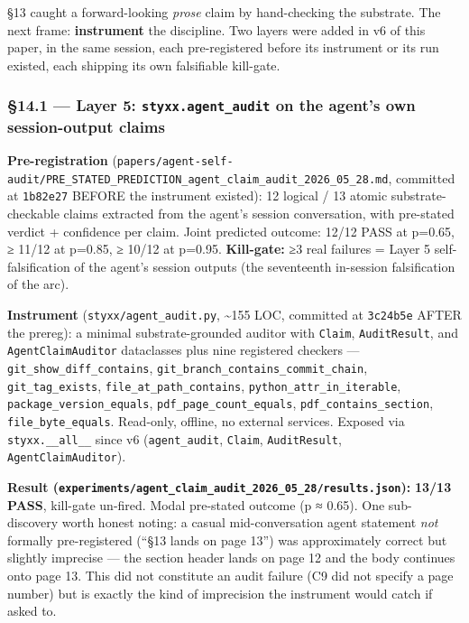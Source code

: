 \documentclass[
]{article}
\begin{document}
§13 caught a forward-looking \emph{prose} claim by hand-checking the
substrate. The next frame: \textbf{instrument} the discipline. Two
layers were added in v6 of this paper, in the same session, each
pre-registered before its instrument or its run existed, each shipping
its own falsifiable kill-gate.

\subsubsection{\texorpdfstring{§14.1 --- Layer 5:
\texttt{styxx.agent\_audit} on the agent's own session-output
claims}{§14.1 --- Layer 5: styxx.agent\_audit on the agent's own session-output claims}}\label{layer-5-styxx.agent_audit-on-the-agents-own-session-output-claims}

\textbf{Pre-registration}
(\texttt{papers/agent-self-audit/PRE\_STATED\_PREDICTION\_agent\_claim\_audit\_2026\_05\_28.md},
committed at \texttt{1b82e27} BEFORE the instrument existed): 12 logical
/ 13 atomic substrate-checkable claims extracted from the agent's
session conversation, with pre-stated verdict + confidence per claim.
Joint predicted outcome: 12/12 PASS at p=0.65, ≥ 11/12 at p=0.85, ≥
10/12 at p=0.95. \textbf{Kill-gate:} ≥3 real failures = Layer 5
self-falsification of the agent's session outputs (the seventeenth
in-session falsification of the arc).

\textbf{Instrument} (\texttt{styxx/agent\_audit.py}, \textasciitilde155
LOC, committed at \texttt{3c24b5e} AFTER the prereg): a minimal
substrate-grounded auditor with \texttt{Claim}, \texttt{AuditResult},
and \texttt{AgentClaimAuditor} dataclasses plus nine registered checkers
--- \texttt{git\_show\_diff\_contains},
\texttt{git\_branch\_contains\_commit\_chain},
\texttt{git\_tag\_exists}, \texttt{file\_at\_path\_contains},
\texttt{python\_attr\_in\_iterable}, \texttt{package\_version\_equals},
\texttt{pdf\_page\_count\_equals}, \texttt{pdf\_contains\_section},
\texttt{file\_byte\_equals}. Read-only, offline, no external services.
Exposed via \texttt{styxx.\_\_all\_\_} since v6 (\texttt{agent\_audit},
\texttt{Claim}, \texttt{AuditResult}, \texttt{AgentClaimAuditor}).

\textbf{Result
(\texttt{experiments/agent\_claim\_audit\_2026\_05\_28/results.json}):}
\textbf{13/13 PASS}, kill-gate un-fired. Modal pre-stated outcome (p ≈
0.65). One sub-discovery worth honest noting: a casual mid-conversation
agent statement \emph{not} formally pre-registered (``§13 lands on page
13'') was approximately correct but slightly imprecise --- the section
header lands on page 12 and the body continues onto page 13. This did
not constitute an audit failure (C9 did not specify a page number) but
is exactly the kind of imprecision the instrument would catch if asked
to.
\end{document}
